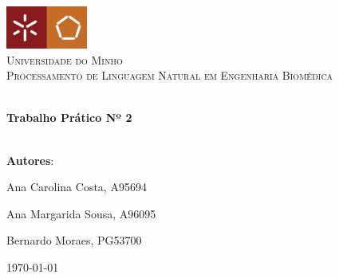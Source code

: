 \begin{titlepage}
\vbox{ }
\begin{center}

\includegraphics[width=0.20\textwidth]{Images/unilogo.jpg}\\[1cm]
\textsc{\LARGE Universidade do Minho}\\[1.5cm]
\textsc{\Large Processamento de Linguagem Natural em Engenharia Biomédica}\\[0.5cm]

\vbox{ }

\HRule \\[0.4cm]
{ \Huge \bfseries Trabalho Prático Nº 2}\\[0.4cm]
\HRule \\[1.5cm]

\begin{center}
\LARGE
\textbf{Autores}:
\begin{center}
    Ana Carolina Costa, A95694
\end{center}
\begin{center}
    Ana Margarida Sousa, A96095
\end{center}
\begin{center}
    Bernardo Moraes, PG53700
\end{center}
\end{center}
\vfill
{\large \today}
\end{center}
\end{titlepage}